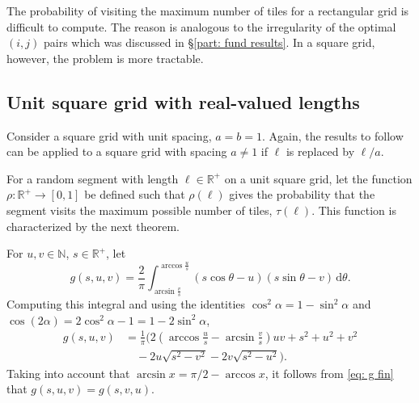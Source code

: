 \documentclass[12pt, a4paper]{article}
\newcommand{\diff}{\mathrm d}
\newcommand{\funt}{\tau} %
\newcommand{\probmax}{\rho} %
\newcommand{\len}{\ell} %
\newcommand{\genvar}{s}
\begin{document}
The probability of visiting the maximum number of tiles for a rectangular grid is difficult to compute. The reason is analogous to the irregularity of the optimal $(i,j)$ pairs which was discussed in \S\ref{part: fund results}. In a square grid, however, the problem is more tractable.


\subsection{Unit square grid with real-valued lengths}
\label{part: probmax: unit square grid, real lengths}

Consider a square grid with unit spacing, $a=b=1$. Again, the results to follow can be applied to a square grid with spacing $a \neq 1$ if $\len$ is replaced by $\len/a$.

For a random segment with length $\len \in \mathbb R^+$ on a unit square grid, let the function $\probmax: \mathbb R^+ \to [0,1]$ be defined such that $\probmax(\len)$ gives the probability that the segment visits the maximum possible number of tiles, $\funt(\len)$. This function is characterized by the next theorem.

For $u, v \in \mathbb N$, $\genvar \in \mathbb R^+$, let
\begin{equation}
\label{eq: g def}
g(\genvar, u, v) = \frac 2 \pi \int_{\arcsin \frac v {\genvar}}^{\arccos \frac u {\genvar}} \left( \genvar \cos \theta - u \right) \left( \genvar \sin \theta - v \right) \, \diff \theta.
\end{equation}
Computing this integral and using the identities $\cos^2 \alpha = 1-\sin^2 \alpha$ and $\cos(2\alpha) = 2\cos^2\alpha-1 = 1 - 2\sin^2\alpha$,
\begin{equation}
\label{eq: g fin}
\begin{split}
g(\genvar, u, v) &= \frac 1 {\pi} \biggl(
2\left(\arccos\frac{u}{\genvar}-\arcsin\frac{v}{\genvar}\right) u v + \genvar^2 + u^2 + v^2 \\
& \quad - 2 u \sqrt{\genvar^2-v^2} - 2 v \sqrt{\genvar^2-u^2} \biggr).
\end{split}
\end{equation}
Taking into account that $\arcsin x = \pi/2 - \arccos x$, it follows from \eqref{eq: g fin} that $g(\genvar, u, v) = g(\genvar, v, u)$.
\end{document}
